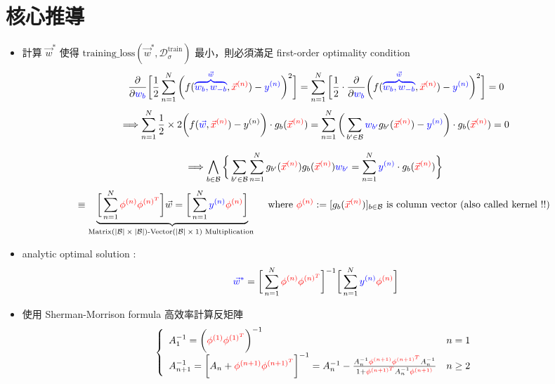 \documentclass{article}
\begin{document}
\begin{CJK}{UTF8}{bsmi}
\begin{itemize}
\end{itemize}

\newpage 
\section{核心推導}
\begin{itemize}
\item 計算 $\vec{w}^{*}$ 使得  $\text{training\_loss$(\vec{w}^{*},\mathcal{D}^{\text{train}}_{\sigma})$}$ 最小，則必須滿足 first-order optimality condition 
$$  \frac{\partial}{\partial \color{blue}w_b} \bigg[ \frac{1}{2}  \sum_{n=1}^{N}   \bigg(f({\color{blue}\overbrace{w_b,w_{-b}}^{\vec{w}}},{\color{red}\vec{x}^{(n)}}) - {\color{blue}y^{(n)} }\bigg)^2 \bigg] =\sum_{n=1}^{N}\bigg[ \frac{1}{2} \cdot \frac{\partial}{\partial \color{blue}w_b}  \bigg(f({\color{blue}\overbrace{w_b,w_{-b}}^{\vec{w}}},{\color{red}\vec{x}^{(n)}}) - {\color{blue}y^{(n)} }\bigg)^2 \bigg] = 0 $$ $$\Longrightarrow \sum_{n=1}^{N} \frac{1}{2} \times 2\bigg( f({\color{blue}\vec{w}},{\color{red}\vec{x}^{(n)}}) - y^{(n)} \bigg)\cdot g_b({\color{red}\vec{x}^{(n)}}) = \sum_{n=1}^{N} \bigg( \sum_{b' \in \mathcal{B}} {\color{blue}w_{b'}} g_{b'}({\color{red}\vec{x}^{(n)}}) - {\color{blue} y^{(n)}} \bigg) \cdot g_{b}({\color{red}\vec{x}^{(n)}})   = 0 $$

$$ \Longrightarrow  \bigwedge_{b \in \mathcal{B}} \bigg\{ \sum_{b' \in \mathcal{B}}   \sum_{n=1}^{N}g_{b'}({\color{red}\vec{x}^{(n)}})g_{b}({\color{red}\vec{x}^{(n)}}) {\color{blue}w_{b'}} = \sum_{n=1}^{N}  {\color{blue}y^{(n)}} \cdot  g_{b}({\color{red}\vec{x}^{(n)}}) \bigg\} $$ $$ \equiv \underbrace{  \bigg[\sum_{n=1}^{N} {\color{red}\phi^{(n)}\phi^{(n)^T}} \bigg] \vec{w} = \bigg[\sum_{n=1}^{N} {\color{blue}y^{(n)}} {\color{red}\phi^{(n)}} \bigg]}_{\text{Matrix$(|\mathcal{B}| \times |\mathcal{B}|)$-Vector$(|\mathcal{B}| \times 1)$ Multiplication }} \quad \text{where } {\color{red}\phi^{(n)}} := [g_{b}({\color{red}\vec{x}^{(n)}})]_{b \in \mathcal{B}} \text{ is column vector (also called kernel !!) }   $$

\item analytic optimal solution :
$$ {\color{blue} \vec{w}^{*}} =   \bigg[\sum_{n=1}^{N} {\color{red}\phi^{(n)}\phi^{(n)^T}} \bigg]^{-1}\bigg[\sum_{n=1}^{N} {\color{blue}y^{(n)}} {\color{red}\phi^{(n)}} \bigg]   $$


\item 使用 Sherman-Morrison formula 高效率計算反矩陣
$$  \left\{\begin{array}{lc}   A_1^{-1} =  \bigg({\color{red} \phi^{(1)} \phi^{(1)^T}}\bigg)^{-1} & n =1 \\ A_{n+1}^{-1} =  \bigg[ A_{n} +{\color{red} \phi^{(n+1)} \phi^{(n+1)^T}} \bigg]^{-1}  =  A_{n}^{-1} - \frac{A_{n}^{-1}{\color{red}\phi^{(n+1)} \phi^{(n+1)^T}} A_{n}^{-1}}{ 1+ {\color{red} \phi^{(n+1)^T}}  A_{n}^{-1} {\color{red}\phi^{(n+1)}}   } & n \geq 2  \end{array}\right.$$

\end{itemize}

\end{CJK}
\end{document}
